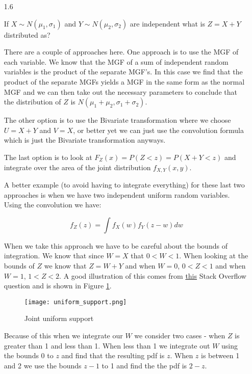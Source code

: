\begin{enumerate}
\item[1.6]

If $X \sim N(\mu_1, \sigma_1)$ and $Y \sim N(\mu_2, \sigma_2)$ are independent what is $Z=X+Y$ distributed as?

There are a couple of approaches here. One approach is to use the MGF of each variable. We know that the MGF of a sum of independent random variables is the product of the separate MGF's. In this case we find that the product of the separate MGFs yields a MGF in the same form as the normal MGF and we can then take out the necessary parameters to conclude that the distribution of  $Z$ is $N(\mu_1+\mu_2, \sigma_1+\sigma_2)$.

The other option is to use the Bivariate transformation where we choose $U=X+Y$ and $V=X$, or better yet we can just use the convolution formula which is just the Bivariate transformation anyways.

The last option is to look at $F_Z(x) = P(Z<z) = P(X+Y<z)$ and integrate over the area of the joint distribution $f_{X,Y}(x,y)$. 

A better example (to avoid having to integrate everything) for these last two approaches is when we have two independent uniform random variables. Using the convolution we have:

\begin{equation}
f_Z(z) = \int f_X(w)f_Y(z-w)dw
\end{equation}

When we take this approach we have to be careful about the bounds of integration. We know that since $W=X$ that $0<W<1$. When looking at the bounds of $Z$ we know that $Z=W+Y$ and when $W=0$, $0<Z<1$ and when $W=1$, $1<Z<2$. A good illustration of this comes from \href{https://math.stackexchange.com/questions/357672/density-of-sum-of-two-uniform-random-variables-0-1}{this} Stack Overflow question and is shown in Figure \ref{fig:uniform_support}.

\begin{figure}[t] \label{fig:uniform_support}
\caption{Joint uniform support}
\centering
 \texttt{[image: uniform\_support.png]}
 \end{figure}

Because of this when we integrate our $W$ we consider two cases - when $Z$ is greater than 1 and less than 1. When less than 1 we integrate out $W$ using the bounds 0 to $z$ and find that the resulting pdf is $z$. When $z$ is between 1 and 2 we use the bounds $z-1$ to 1 and find the the pdf is $2-z$. 


\end{enumerate}

